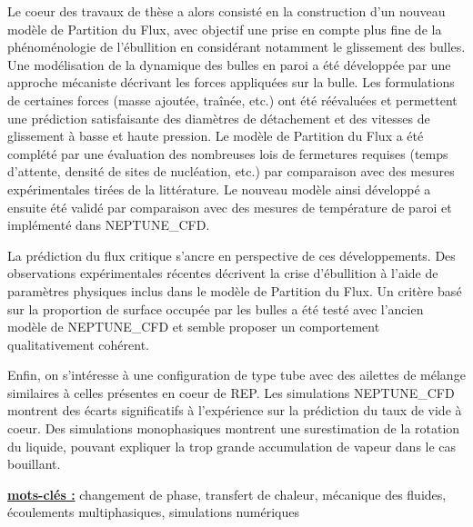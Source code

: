 \npar

Le coeur des travaux de thèse a alors consisté en la construction d’un nouveau modèle de Partition du Flux, avec objectif une prise en compte plus fine de la phénoménologie de l’ébullition en considérant notamment le glissement des bulles. Une modélisation de la dynamique des bulles en paroi a été développée par une approche mécaniste décrivant les forces appliquées sur la bulle. Les formulations de certaines forces (masse ajoutée, traînée, etc.) ont été réévaluées et permettent une prédiction satisfaisante des diamètres de détachement et des vitesses de glissement à basse et haute pression. Le modèle de Partition du Flux a été complété par une évaluation des nombreuses lois de fermetures requises (temps d’attente, densité de sites de nucléation, etc.) par comparaison avec des mesures expérimentales tirées de la littérature. Le nouveau modèle ainsi développé a ensuite été validé par comparaison avec des mesures de température de paroi et implémenté dans NEPTUNE\_CFD.

\npar

La prédiction du flux critique s’ancre en perspective de ces développements. Des observations expérimentales récentes décrivent la crise d’ébullition à l’aide de paramètres physiques inclus dans le modèle de Partition du Flux. Un critère basé sur la proportion de surface occupée par les bulles a été testé avec l’ancien modèle de NEPTUNE\_CFD et semble proposer un comportement qualitativement cohérent.

\npar

Enfin, on s’intéresse à une configuration de type tube avec des ailettes de mélange similaires à celles présentes en coeur de REP. Les simulations NEPTUNE\_CFD montrent des écarts significatifs à l’expérience sur la prédiction du taux de vide à coeur. Des simulations monophasiques montrent une surestimation de la rotation du liquide, pouvant expliquer la trop grande accumulation de vapeur dans le cas bouillant.
\endgroup			

\npar

\npar


\textbf{\underline{mots-clés :}} changement de phase, transfert de chaleur, mécanique des fluides, écoulements multiphasiques, simulations numériques
\vfill